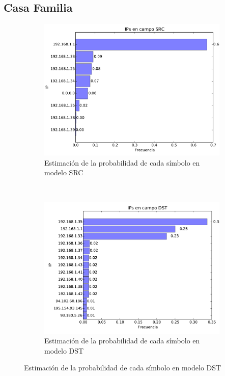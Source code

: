 \subsection{Casa Familia}

\begin{figure}[H]
	\center
	\begin{subfigure}{0.4\textwidth}
		\includegraphics[width=1.0\textwidth]{resultados/casa/ipsSrc_1_6805902069.pdf}
		\caption{Estimaci\'on de la probabilidad de cada s\'imbolo en modelo SRC}
	\end{subfigure}
	~
	\begin{subfigure}{0.4\textwidth}
		\includegraphics[width=1.0\textwidth]{resultados/casa/ipsDst_2_67355481854.pdf}
		\caption{Estimaci\'on de la probabilidad de cada s\'imbolo en modelo DST}
	\end{subfigure}
\end{figure}

